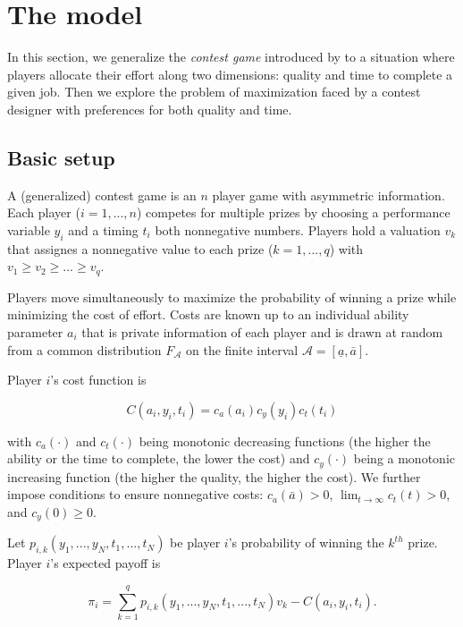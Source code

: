 \documentclass[12pt,]{article}
\theoremstyle{plain} %
\newcommand\lotype{\underline{a}}
\newcommand\hitype{\bar{a}}
\begin{document}
\section{The model}\label{the-model}

In this section, we generalize the \emph{contest game} introduced by
\citet{moldovanu2001optimal} to a situation where players allocate their
effort along two dimensions: quality and time to complete a given job.
Then we explore the problem of maximization faced by a contest designer
with preferences for both quality and time.

\subsection{Basic setup}\label{basic-setup}

A (generalized) contest game is an \(n\) player game with asymmetric
information. Each player (\(i=1,..., n\)) competes for multiple prizes
by choosing a performance variable \(y_i\) and a timing \(t_i\) both
nonnegative numbers. Players hold a valuation \(v_k\) that assignes a
nonnegative value to each prize (\(k=1, ..., q\)) with
\(v_1\geq v_2 \geq ...\geq v_q\).

Players move simultaneously to maximize the probability of winning a
prize while minimizing the cost of effort. Costs are known up to an
individual ability parameter \(a_i\) that is private information of each
player and is drawn at random from a common distribution
\(F_{\mathcal{A}}\) on the finite interval
\(\mathcal{A}=[\lotype, \hitype]\).

Player \(i\)'s cost function is

\begin{equation}
  C(a_i, y_i, t_i) = c_a(a_i) c_y(y_i) c_t(t_i)
\end{equation}

with \(c_a(\cdot)\) and \(c_t(\cdot)\) being monotonic decreasing
functions (the higher the ability or the time to complete, the lower the
cost) and \(c_{y}(\cdot)\) being a monotonic increasing function (the
higher the quality, the higher the cost). We further impose conditions
to ensure nonnegative costs: \(c_{a}(\hitype)>0\),
\(\lim_{t\rightarrow \infty}c_{t}(t)>0\), and \(c_{y}(0)\geq 0\).

Let \(p_{i, k}(y_1,..., y_N, t_1, ..., t_N)\) be player \(i\)'s
probability of winning the \(k^{th}\) prize. Player \(i\)'s expected
payoff is

\begin{equation}
  \label{expected payoff}
  \pi_i = \sum_{k=1}^{q} p_{i, k}(y_1,..., y_N, t_1, ..., t_N) v_k - C(a_i, y_i, t_i). 
\end{equation}
\end{document}
